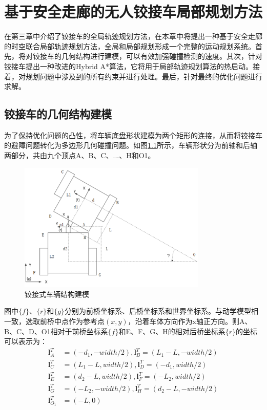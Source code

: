 \documentclass[master,academic]{ysuthesis} %
\begin{document}
	\chapter{基于安全走廊的无人铰接车局部规划方法}
	在第三章中介绍了铰接车的全局轨迹规划方法，在本章中将提出一种基于安全走廊的时空联合局部轨迹规划方法，全局和局部规划形成一个完整的运动规划系统。首先，将对铰接车的几何结构进行建模，可以有效加强碰撞检测的速度。其次，针对铰接车提出一种改进的Hybrid A*算法，它将用于局部轨迹规划算法的热启动。接着，对规划问题中涉及到的所有约束并进行处理。最后，针对最终的优化问题进行求解。
	\section{铰接车的几何结构建模}
	为了保持优化问题的凸性，将车辆底盘形状建模为两个矩形的连接，从而将铰接车的避障问题转化为多边形几何碰撞问题。如图\ref{fig:铰接车外观结构建模}所示，车辆形状分为前轴和后轴两部分，共由九个顶点A、B、C、...、H和O1。
	\begin{figure}[H]
		\centering
		\includegraphics[width=0.8\textwidth]{铰接车几何结构.png}
		\caption{铰接式车辆结构建模}
		\label{fig:铰接车外观结构建模}
	\end{figure}
	图中$\{f\}$、$\{r\}$和$\{g\}$分别为前桥坐标系、后桥坐标系和世界坐标系。与动学模型相一致，选取前桥中点作为参考点$(x,y)$，沿着车体方向作为x轴正方向。则A、B、C、D、O1相对于前桥坐标系$\{f\}$和E、F、G、H的相对后桥坐标系$\{r\}$的坐标可以表示为：
	\begin{equation}
		\begin{aligned}
			\bm{l}_{A}^{T}&=( -d_1,-width/2 ) ,\bm{l}_{B}^{T}=( L_1-L,-width/2 ) \\
			\bm{l}_{C}^{T}&=( L_1-L,width/2 ) ,\bm{l}_{D}^{T}=( -d_1,width/2 ) \\
			\bm{l}_{E}^{T}&=( d_2-L,width/2 ) ,\bm{l}_{F}^{T}=( -L_2,width/2 ) \\
			\bm{l}_{G}^{T}&=( -L_2,-width/2 ) ,\bm{l}_{H}^{T}=( d_2-L,-width/2 ) \\
			\bm{l}_{O_1}^{T}&=( -L,0 ) 
		\end{aligned}
		\label{eq:铰接车顶点}
	\end{equation}
\end{document}
